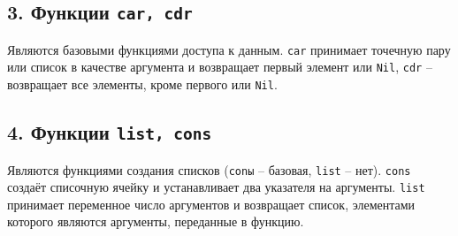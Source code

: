 \subsection*{3. Функции {\texttt{car, cdr}}}

Являются базовыми функциями доступа к данным. {\texttt{car}} принимает точечную пару или список в качестве аргумента и возвращает первый элемент или {\texttt{Nil}}, {\texttt{cdr}} -- возвращает все элементы, кроме первого или {\texttt{Nil}}.

\subsection*{4. Функции {\texttt{list, cons}}}

Являются функциями создания списков ({\texttt{conы}} -- базовая, {\texttt{list}} -- нет). {\texttt{cons}} создаёт списочную ячейку и устанавливает два указателя на аргументы. {\texttt{list}} принимает переменное число аргументов и возвращает список, элементами которого являются аргументы, переданные в функцию.